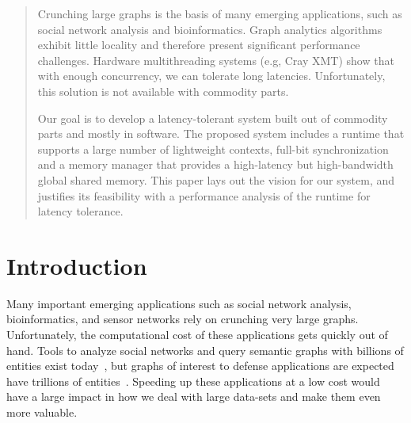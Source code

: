 \documentclass[10pt,nocopyrightspace,preprint]{sigplanconf}
\begin{document}
\begin{abstract}
   Crunching large graphs is the basis of many emerging applications,
   such as social network analysis and bioinformatics. Graph analytics
   algorithms exhibit little locality and therefore present significant
   performance challenges. Hardware multithreading systems (e.g, Cray
   XMT) show that with enough concurrency, we can tolerate long
   latencies. Unfortunately, this solution is not available with
   commodity parts.
 
   Our goal is to develop a latency-tolerant system built out of
   commodity parts and mostly in software. The proposed system includes
   a runtime that supports a large number of lightweight contexts,
   full-bit synchronization and a memory manager that provides a
   high-latency but high-bandwidth global shared memory. This paper
   lays out the vision for our system, and justifies its feasibility
   with a performance analysis of the runtime for latency tolerance.
 
\end{abstract}

\section{Introduction}

Many important emerging applications such as social network analysis,
bioinformatics, and sensor networks rely on crunching very large
graphs. Unfortunately, the computational cost of these applications
gets quickly out of hand. Tools to analyze social networks and query
semantic graphs with billions of entities exist
today~\cite{joslyn:hpsf, ediger:msda, brocheler:cosi, pegasus,
  pregel}, but graphs of interest to defense applications are expected
have trillions of entities~\cite{hartley:mssg, kolda:imkd}. Speeding
up these applications at a low cost would have a large impact in how
we deal with large data-sets and make them even more valuable.



\end{document}
